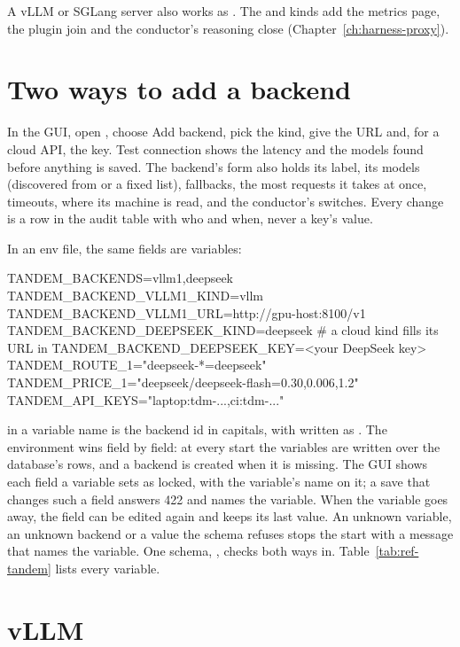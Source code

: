 A vLLM or SGLang server also works as . The  and  kinds add the metrics page, the plugin join and the conductor's reasoning close (Chapter~\ref{ch:harness-proxy}).

\section{Two ways to add a backend}

In the GUI, open , choose Add backend, pick the kind, give the URL and, for a cloud API, the key. Test connection shows the latency and the models found before anything is saved. The backend's form also holds its label, its models (discovered from  or a fixed list), fallbacks, the most requests it takes at once, timeouts, where its machine is read, and the conductor's switches. Every change is a row in the audit table with who and when, never a key's value.

In an env file, the same fields are  variables:

\begin{shell}
TANDEM_BACKENDS=vllm1,deepseek
TANDEM_BACKEND_VLLM1_KIND=vllm
TANDEM_BACKEND_VLLM1_URL=http://gpu-host:8100/v1
TANDEM_BACKEND_DEEPSEEK_KIND=deepseek          # a cloud kind fills its URL in
TANDEM_BACKEND_DEEPSEEK_KEY=<your DeepSeek key>
TANDEM_ROUTE_1="deepseek-*=deepseek"
TANDEM_PRICE_1="deepseek/deepseek-flash=0.30,0.006,1.2"
TANDEM_API_KEYS="laptop:tdm-...,ci:tdm-..."
\end{shell}

 in a variable name is the backend id in capitals, with \code{-} written as \code{_}. The environment wins field by field: at every start the variables are written over the database's rows, and a backend is created when it is missing. The GUI shows each field a variable sets as locked, with the variable's name on it; a save that changes such a field answers 422 and names the variable. When the variable goes away, the field can be edited again and keeps its last value. An unknown variable, an unknown backend or a value the schema refuses stops the start with a message that names the variable. One schema, , checks both ways in. Table~\ref{tab:ref-tandem} lists every variable.

\section{vLLM}

